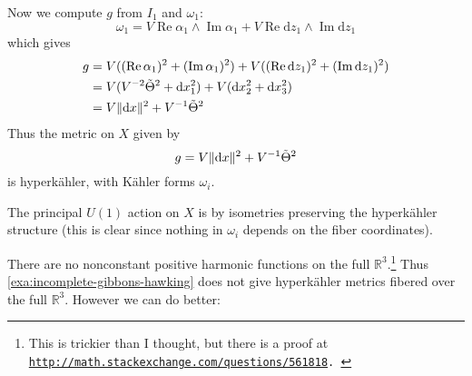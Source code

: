 \documentclass[12pt,letterpaper,reqno]{amsart}
\numberwithin{equation}{section}
\newcommand{\R}{\ensuremath{\mathbb R}}
\newcommand{\kahler}{K\"ahler\xspace}
\newcommand{\hk}{hyperk\"ahler\xspace}
\newcommand{\de}{\mathrm{d}}
\newcommand{\norm}[1]{\lVert#1\rVert}
\DeclareMathOperator{\im}{Im}
\DeclareMathOperator{\re}{Re}
\begin{document}
\begin{example}
Now we compute $g$ from $I_1$ and $\omega_1$:
\begin{equation}
  \omega_1 = V \re \alpha_1 \wedge \im \alpha_1 + V \re \de z_1 \wedge \im \de z_1
\end{equation}
which gives
\begin{align}
  g &= V ((\re \alpha_1)^2 + (\im \alpha_1)^2) + V ((\re \de z_1)^2 + (\im \de z_1)^2) \\
  &= V (V^{-2} \tTheta^2 + \de x_1^2) + V (\de x_2^2 + \de x_3^2) \\
  &= V \norm{\de x}^2 + V^{-1} \tTheta^2
\end{align}
Thus the metric on $X$ given by
\begin{equation}
  g = V \norm{\de x}^2 + V^{-1} \tTheta^2
\end{equation}
is \hk, with \kahler forms $\omega_i$.

The principal $U(1)$ action on $X$ is by isometries preserving
the \hk structure (this is clear since nothing in $\omega_i$
depends on the fiber coordinates).
\end{example}

There are no 
nonconstant positive harmonic functions on the full $\R^3$.\footnote{
This is trickier than I thought, but there is a proof 
at \tt\href{http://math.stackexchange.com/questions/561818}{http://math.stackexchange.com/questions/561818}.
}
Thus \autoref{exa:incomplete-gibbons-hawking} does not give
\hk metrics fibered over the full $\R^3$.
However we can do better:
\end{document}
